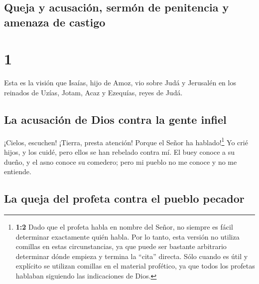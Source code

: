 \hypertarget{queja-y-acusaciuxf3n-sermuxf3n-de-penitencia-y-amenaza-de-castigo}{%
\subsection{Queja y acusación, sermón de penitencia y amenaza de
castigo}\label{queja-y-acusaciuxf3n-sermuxf3n-de-penitencia-y-amenaza-de-castigo}}

\hypertarget{section}{%
\section{1}\label{section}}

 Esta es la visión que Isaías, hijo de Amoz, vio sobre
Judá y Jerusalén en los reinados de Uzías, Jotam, Acaz y Ezequías, reyes
de Judá.

\hypertarget{la-acusaciuxf3n-de-dios-contra-la-gente-infiel}{%
\subsection{La acusación de Dios contra la gente
infiel}\label{la-acusaciuxf3n-de-dios-contra-la-gente-infiel}}

 ¡Cielos, escuchen! ¡Tierra, presta atención! Porque el
Señor ha hablado!\footnote{\textbf{1:2} Dado que el profeta habla en
  nombre del Señor, no siempre es fácil determinar exactamente quién
  habla. Por lo tanto, esta versión no utiliza comillas en estas
  circunstancias, ya que puede ser bastante arbitrario determinar dónde
  empieza y termina la ``cita'' directa. Sólo cuando es útil y explícito
  se utilizan comillas en el material profético, ya que todos los
  profetas hablaban siguiendo las indicaciones de Dios.} Yo crié hijos,
y los cuidé, pero ellos se han rebelado contra mí.  El
buey conoce a su dueño, y el asno conoce su comedero; pero mi pueblo no
me conoce y no me entiende.

\hypertarget{la-queja-del-profeta-contra-el-pueblo-pecador}{%
\subsection{La queja del profeta contra el pueblo
pecador}\label{la-queja-del-profeta-contra-el-pueblo-pecador}}

